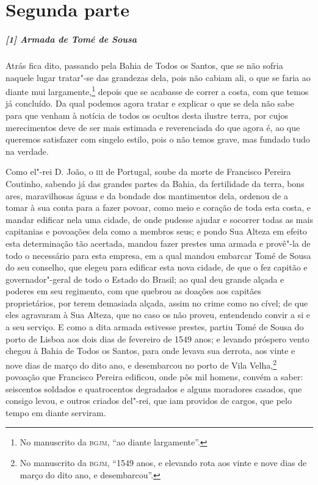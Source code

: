 \chapter[Segunda parte: Memorial e declaração]{Segunda parte }

\begin{linenumbers}

\paragraph{[1] Armada de Tomé de Sousa} \quad
Atrás fica dito, passando pela Bahia de Todos os Santos, que se não sofria naquele lugar
tratar"-se das grandezas dela, pois não cabiam ali, o que se faria ao diante mui
largamente,\footnote{ No manuscrito da \textsc{bgjm}, ``ao diante largamente''.} depois
que se acabasse de correr a costa, com que temos já concluído. Da qual podemos agora
tratar e explicar o que se dela não sabe para que venham à notícia de todos os ocultos
desta ilustre terra, por cujos merecimentos deve de ser mais estimada e reverenciada do
que agora é, ao que queremos satisfazer com singelo estilo, pois o não temos grave, mas
fundado tudo na verdade.

Como el"-rei D. João, o \textsc{iii} de Portugal, soube da morte de Francisco Pereira
Coutinho, sabendo já das grandes partes da Bahia, da fertilidade da terra, bons ares,
maravilhosas águas e da bondade dos mantimentos dela, ordenou de a tomar à sua conta para
a fazer povoar, como meio e coração de toda esta costa, e mandar edificar nela uma cidade,
de onde pudesse ajudar e socorrer todas as mais capitanias e povoações dela como a membros
seus; e pondo Sua Alteza em efeito esta determinação tão acertada, mandou fazer prestes
uma armada e provê"-la de todo o necessário para esta empresa, em a qual mandou embarcar
Tomé de Sousa do seu conselho, que elegeu para edificar esta nova cidade, de que o fez
capitão e governador"-geral de todo o Estado do Brasil; ao qual deu grande alçada e poderes
em seu regimento, com que quebrou as doações aos capitães proprietários, por terem
demasiada alçada, assim no crime como no cível; de que eles agravaram à Sua Alteza, que no
caso os não proveu, entendendo convir a si e a seu serviço. E como a dita armada estivesse
prestes, partiu Tomé de Sousa do porto de Lisboa aos dois dias de fevereiro de 1549 anos;
e levando próspero vento chegou à Bahia de Todos os Santos, para onde levava sua derrota,
aos vinte e nove dias de março do dito ano, e desembarcou no porto de Vila
Velha,\footnote{ No manuscrito da \textsc{bgjm}, ``1549 anos, e elevando rota aos vinte e
nove dias de março do dito ano, e desembarcou''.} povoação que Francisco Pereira edificou,
onde pôs mil homens, convém a saber: seiscentos soldados e quatrocentos degradados e
alguns moradores casados, que consigo levou, e outros criados del"-rei, que iam providos de
cargos, que pelo tempo em diante serviram.


\end{linenumbers}
